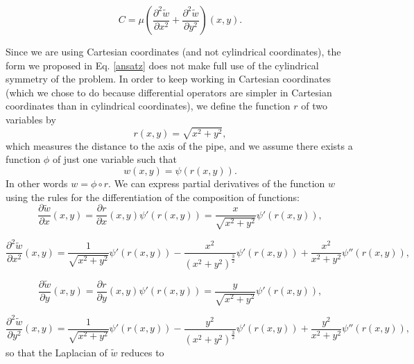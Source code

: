 \documentclass[DIV=12]{article}
\begin{document}
\begin{equation}
C =  \mu \left(\frac{\partial^2 {\tilde{w}}}{\partial x^2} + \frac{\partial^2 {\tilde{w}}}{\partial y^2}   \right)(x,y).
\label{constxy}
\end{equation}

 Since we are using Cartesian coordinates (and not cylindrical coordinates), the form we proposed in Eq. \ref{ansatz}
 does not make full use of the cylindrical symmetry of the problem. In order to keep working in Cartesian coordinates (which 
 we chose to do because differential operators are simpler in Cartesian coordinates than in cylindrical coordinates), we 
 define the function $r$ of two variables by 
\begin{equation}
 r( x,y) = \sqrt{x^2 + y^2},
\end{equation}
 which measures the distance to the axis of the pipe, and we
assume there exists a function $\phi$ of just one variable such that
\begin{equation}
 w( x,y ) = \psi( r( x,y)).
\end{equation}
 In other words $w = \phi \circ r$. We can express partial derivatives of 
 the  function $w$ using the rules for the differentiation of 
 the composition of functions:\\

\begin{equation}
\frac{\partial {\tilde{w}} }{\partial x} (x,y)= \frac{\partial r }{\partial x}(x,y) \psi'( r(x,y)) = \frac{x}{\sqrt{x^2 + y^2}}\psi'( r(x,y)),
\end{equation}

\begin{equation}
\frac{\partial^2 {\tilde{w}} }{\partial x^2} (x,y)= \frac{1 }{ \sqrt{x^2 + y^2}} \psi'( r(x,y)) - \frac{x^2}{(x^2 + y^2 )^{\frac{3}{2}}}\psi'( r(x,y)) 
+  \frac{x^2}{x^2 + y^2}\psi''( r(x,y)),
\end{equation}

\begin{equation}
\frac{\partial {\tilde{w}}}{\partial y} (x,y)= \frac{\partial r }{\partial y}(x,y) \psi'( r(x,y)) = \frac{y}{\sqrt{x^2 + y^2}}\psi'( r(x,y)),
\end{equation}

\begin{equation}
\frac{\partial^2 {\tilde{w}} }{\partial y^2} (x,y)= \frac{1 }{ \sqrt{x^2 + y^2}} \psi'( r(x,y)) - \frac{y^2}{(x^2 + y^2 )^{\frac{3}{2}}}\psi'( r(x,y)) 
+  \frac{y^2}{x^2 + y^2}\psi''( r(x,y)),
\end{equation}
so that the Laplacian of ${\tilde{w}}$ reduces to
\end{document}
